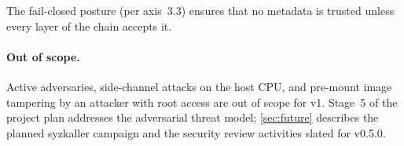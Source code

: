 The fail-closed posture (per axis~3.3) ensures that no metadata is
trusted unless every layer of the chain accepts it.

\paragraph{Out of scope.}
Active adversaries, side-channel attacks on the host CPU, and
pre-mount image tampering by an attacker with root access are out
of scope for v1. Stage~5 of the project plan addresses the
adversarial threat model; \cref{sec:future} describes the
planned syzkaller campaign and the security review activities
slated for v0.5.0.
